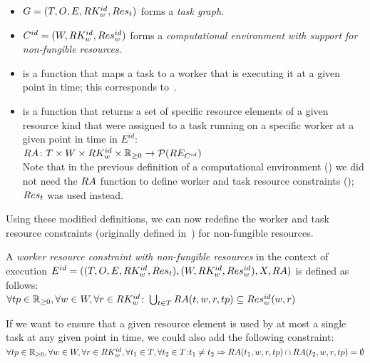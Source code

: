 \begin{itemize}[itemsep=0pt]
	\item $G = (T, O, E, RK_w^{id}, Res_t)$ forms a \emph{task graph}.
	\item $C^{id} = (W, RK_w^{id}, Res_w^{id})$ forms a
	\emph{computational environment with support for non-fungible resources}.
	\item \fntaskworkerassigned{} is a function that maps a task to a worker that is executing it
	at a given point in time; this corresponds to~.
	\item \fntaskresassigned{} is a function that returns a set of specific resource elements of a
	      given resource kind that were assigned to a task running on a specific worker at a given point in
	      time in $E^{id}$: \\ $RA\colon T \times W \times RK_w^{id} \times \mathbb{R}_{\geq{}0} \rightarrow
		      \mathcal{P}(RE_{C^{id}})$ \vspace{2mm}\\ Note that in the
	      previous definition of a computational environment () we did not
		  need the $RA$ function to define worker and task resource constraints
		  (); $Res_t$ was used instead.
\end{itemize}

Using these modified definitions, we can now redefine the
worker and task resource constraints (originally defined
in~) for non-fungible
resources.

\vspace{2mm}
 A
\emph{worker resource constraint with non-fungible resources} in the context of execution $E^{id} = ((T, O, E, RK_w^{id}, Res_t), (W, RK_w^{id}, Res_w^{id}), X,
RA)$ is
defined as follows: \vspace{1mm}\\ $\forall tp\in\mathbb{R}_{\geq{}0}, \forall w\in{}W, \forall
	r\in{}RK_w^{id}\colon \bigcup_{t\in{}T}
	RA(t, w, r, tp) \subseteq Res_w^{id}(w, r)$

\vspace{2mm}If we want to ensure that a given resource element is used by at most a
single task at any given
point in time, we could also add the following constraint: \vspace{2mm}\\
$\forall tp\in\mathbb{R}_{\geq{}0}, \forall w\in{}W, \forall
	r\in{}RK_w^{id}, \forall t_1\in{}T, \forall
	t_2\in{}T\colon \\t_1 \neq t_2 \Rightarrow RA(t_1, w, r, tp) \cap
	RA(t_2, w, r, tp) = \emptyset$ \\

